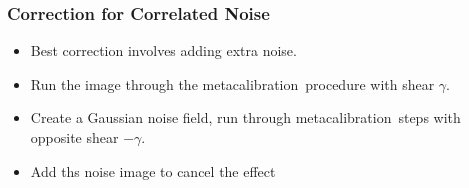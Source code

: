 \documentclass{beamer}
\newcommand{\mcal}{metacalibration}
\begin{document}
\frame
{
    \frametitle{Correction for Correlated Noise}

 
    \begin{itemize}

        \item Best correction involves adding extra noise.

        \item Run the image through the \mcal\ procedure with
            shear $\gamma$.

        \item Create a Gaussian noise field, run through \mcal\ steps with
            opposite shear $-\gamma$.

        \item Add ths noise image to cancel the effect

    \end{itemize}

}






\end{document}
